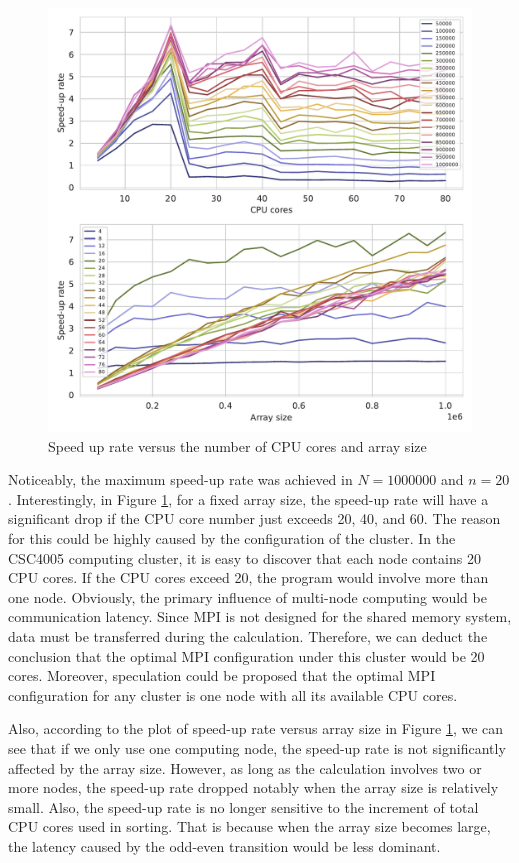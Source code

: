 \documentclass[twoside,12pt]{article}
\theoremstyle{definition}
\theoremstyle{remark}
\begin{document}
\begin{figure}[H]
    \centering
    \includegraphics[width=\textwidth]{../analysis/rate.pdf}
    \caption{Speed up rate versus the number of CPU cores and array size}
    \label{fig:rate}
\end{figure}

Noticeably, the maximum speed-up rate was achieved in $N=1000000$ and $n=20$.
Interestingly, in Figure \ref{fig:rate}, for a fixed array size,
the speed-up rate will have a significant drop if the CPU core number just exceeds 20, 40, and 60.
The reason for this could be highly caused by the configuration of the cluster.
In the CSC4005 computing cluster, it is easy to discover that each node contains
20 CPU cores.
If the CPU cores exceed 20, the program would involve more than one node.
Obviously, the primary influence of multi-node computing would be communication latency.
Since MPI is not designed for the shared memory system, data must be transferred during the
calculation.
Therefore, we can deduct the conclusion that the optimal MPI configuration
under this cluster would be 20 cores.
Moreover, speculation could be proposed that the optimal MPI configuration
for any cluster is one node with all its available CPU cores.


Also, according to the plot of speed-up rate versus array size in Figure \ref{fig:rate},
we can see that if we only use one computing node, the speed-up rate is not
significantly affected by the array size.
However, as long as the calculation involves two or more nodes, the speed-up rate 
dropped notably when the array size is relatively small.
Also, the speed-up rate is no longer sensitive to the increment of total CPU cores
used in sorting.
That is because when the array size becomes large, the latency caused by
the odd-even transition would be less dominant.
\end{document}
